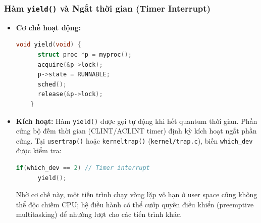 \subsubsection{Hàm \texttt{yield()} và Ngắt thời gian (Timer Interrupt)}
\begin{itemize}
    \item \textbf{Cơ chế hoạt động:}
    \begin{lstlisting}[language=C]
    void yield(void) {
      struct proc *p = myproc();
      acquire(&p->lock);
      p->state = RUNNABLE;
      sched();
      release(&p->lock);
    }
    \end{lstlisting}
    \item \textbf{Kích hoạt:} Hàm \texttt{yield()} được gọi tự động khi hết quantum thời gian. Phần cứng bộ đếm thời gian (CLINT/ACLINT timer) định kỳ kích hoạt ngắt phần cứng. Tại \texttt{usertrap()} hoặc \texttt{kerneltrap()} (\texttt{kernel/trap.c}), biến \texttt{which\_dev} được kiểm tra:
    \begin{lstlisting}[language=C]
    if(which_dev == 2) // Timer interrupt
      yield();
    \end{lstlisting}
    Nhờ cơ chế này, một tiến trình chạy vòng lặp vô hạn ở user space cũng không thể độc chiếm CPU; hệ điều hành có thể cướp quyền điều khiển (preemptive multitasking) để nhường lượt cho các tiến trình khác.
\end{itemize}

